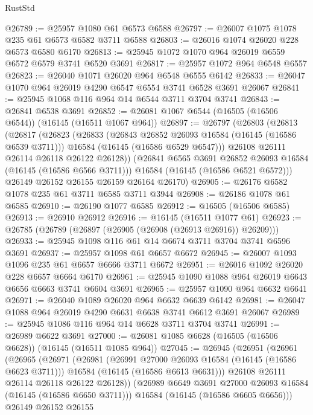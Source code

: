 \begin{lexlean}{RustStd}
\begin{coremodule}
@26789 := @25957 @1080 @61 @6573 @6588
@26797 := @26007 @1075 @1078 @235 @61 @6573 @6582 @3711 @6588
@26803 := @26016 @1074 @26020 @228 @6573 @6580 @6170
@26813 := @25945 @1072 @1070 @964 @26019 @6559 @6572 @6579 @3741 @6520 @3691
@26817 := @25957 @1072 @964 @6548 @6557
@26823 := @26040 @1071 @26020 @964 @6548 @6555 @6142
@26833 := @26047 @1070 @964 @26019 @4290 @6547 @6554 @3741 @6528 @3691 @26067
@26841 := @25945 @1068 @116 @964 @14 @6544 @3711 @3704 @3741
@26843 := @26841 @6538 @3691
@26852 := @26081 @1067 @6544 (@16505 (@16506 @6544)) (@16145 (@16511 @1067 @964))
@26897 := @26797
    (@26803
      (@26813
        (@26817
          (@26823
            (@26833
              (@26843 @26852 @26093 @16584 (@16145 (@16586 @6539 @3711)))
              @16584
              (@16145 (@16586 @6529 @6547)))
            @26108
            @26111
            @26114
            @26118
            @26122
            @26128))
        (@26841 @6565 @3691 @26852 @26093 @16584 (@16145 (@16586 @6566 @3711)))
        @16584
        (@16145 (@16586 @6521 @6572)))
      @26149
      @26152
      @26155
      @26159
      @26164
      @26170)
@26905 := @26176 @6582 @1078 @235 @61 @3711 @6585 @3711 @3944
@26908 := @26186 @1078 @61 @6585
@26910 := @26190 @1077 @6585
@26912 := @16505 (@16506 @6585)
@26913 := @26910 @26912
@26916 := @16145 (@16511 @1077 @61)
@26923 := @26785 (@26789 (@26897 (@26905 (@26908 (@26913 @26916)) @26209)))
@26933 := @25945 @1098 @116 @61 @14 @6674 @3711 @3704 @3741 @6596 @3691
@26937 := @25957 @1098 @61 @6657 @6672
@26945 := @26007 @1093 @1096 @235 @61 @6657 @6666 @3711 @6672
@26951 := @26016 @1092 @26020 @228 @6657 @6664 @6170
@26961 := @25945 @1090 @1088 @964 @26019 @6643 @6656 @6663 @3741 @6604 @3691
@26965 := @25957 @1090 @964 @6632 @6641
@26971 := @26040 @1089 @26020 @964 @6632 @6639 @6142
@26981 := @26047 @1088 @964 @26019 @4290 @6631 @6638 @3741 @6612 @3691 @26067
@26989 := @25945 @1086 @116 @964 @14 @6628 @3711 @3704 @3741
@26991 := @26989 @6622 @3691
@27000 := @26081 @1085 @6628 (@16505 (@16506 @6628)) (@16145 (@16511 @1085 @964))
@27045 := @26945
    (@26951
      (@26961
        (@26965
          (@26971
            (@26981
              (@26991 @27000 @26093 @16584 (@16145 (@16586 @6623 @3711)))
              @16584
              (@16145 (@16586 @6613 @6631)))
            @26108
            @26111
            @26114
            @26118
            @26122
            @26128))
        (@26989 @6649 @3691 @27000 @26093 @16584 (@16145 (@16586 @6650 @3711)))
        @16584
        (@16145 (@16586 @6605 @6656)))
      @26149
      @26152
      @26155

\end{coremodule}
\end{lexlean}
